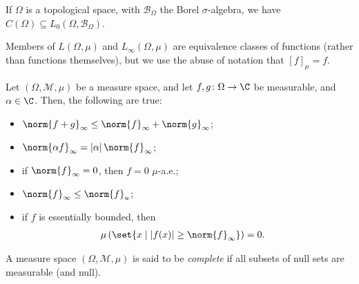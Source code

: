 \begin{fact}
  If $\Omega$ is a topological space, with $\mathcal{B}_{\Omega}$ the Borel $\sigma$-algebra, we have $C\left(\Omega\right)\subseteq L_{0}\left(\Omega,\mathcal{B}_{\Omega}\right)$.\newline
\end{fact}
\begin{remark}
  Members of $L\left(\Omega,\mu\right)$ and $L_{\infty}\left(\Omega,\mu\right)$ are equivalence classes of functions (rather than functions themselves), but we use the abuse of notation that $\left[f\right]_{\mu} = f$.
\end{remark}

\begin{fact}
  Let $\left(\Omega,\mathcal{M},\mu\right)$ be a measure space, and let $f,g\colon \Omega\rightarrow \C$ be measurable, and $\alpha \in \C$. Then, the following are true:
  \begin{itemize}
    \item $\displaystyle \norm{f+g}_{\infty}\leq \norm{f}_{\infty} + \norm{g}_{\infty}$;
    \item $\displaystyle \norm{\alpha f}_{\infty} = \left\vert \alpha \right\vert\norm{f}_{\infty}$;
    \item if $\displaystyle \norm{f}_{\infty} = 0$, then $f = 0$ $\mu$-a.e.;
    \item $\displaystyle \norm{f}_{\infty}\leq \norm{f}_{u}$;
    \item if $f$ is essentially bounded, then
      \begin{align*}
        \mu\left(\set{x\mid \left\vert f(x) \right\vert\geq \norm{f}_{\infty}}\right) &= 0.
      \end{align*}
  \end{itemize}
\end{fact}

\begin{definition}
A measure space $\left(\Omega,\mathcal{M},\mu\right)$ is said to be \textit{complete} if all subsets of null sets are measurable (and null).
\end{definition}
